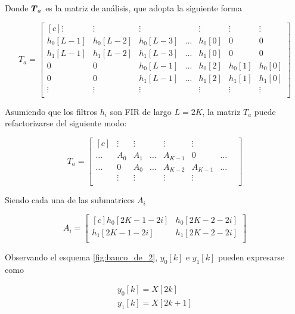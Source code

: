 Donde $\boldsymbol{T}_a$ es la matriz de análisis, que adopta la siguiente forma

	\begin{equation}
		T_a=
		\begin{bmatrix*}[c]
			\vdots & \vdots & \vdots & & \vdots & \vdots & \vdots\\
			h_0[L-1] & h_0[L-2] & h_0[L-3] & \hdots & h_0[0] & 0 & 0 \\
			h_1[L-1] & h_1[L-2] & h_1[L-3] & \hdots & h_1[0] & 0 & 0 \\
			0 & 0 & h_0[L-1] & \hdots & h_0[2] & h_0[1] & h_0[0] \\
			0 & 0 & h_1[L-1] & \hdots & h_1[2] & h_1[1] & h_1[0] \\
			\vdots & \vdots & \vdots & & \vdots & \vdots & \vdots \\
		\end{bmatrix*}
	\end{equation}

Asumiendo que los filtros $h_i$ son FIR de largo $L=2K$, la matriz $T_a$ puede refactorizarse del siguiente modo:

	\begin{equation}
		T_a=
		\begin{bmatrix*}[c]
			 & \vdots & \vdots &  & \vdots & \vdots & &\\
			\hdots & A_0 & A_1 & \hdots & A_{K-1} & 0 & \hdots  \\
			\hdots & 0 & A_0 & \hdots & A_{K-2} & A_{K-1} & \hdots  \\
			 & \vdots & \vdots &  & \vdots & \vdots & &\\		
		\end{bmatrix*}
	\end{equation}

Siendo cada una de las submatrices $A_i$

	\begin{equation}
		A_i=
		\begin{bmatrix*}[c]
			h_0[2K-1-2i] & h_0[2K-2-2i] \\
			h_1[2K-1-2i] & h_1[2K-2-2i] \\
		\end{bmatrix*}
	\end{equation}

Observando el esquema \ref{fig:banco_de_2}, $y_0[k]$ e $y_1[k]$ pueden expresarse como

	\begin{align}
		y_0[k]=X[2k]	\\
		y_1[k]=X[2k+1]
	\end{align}

